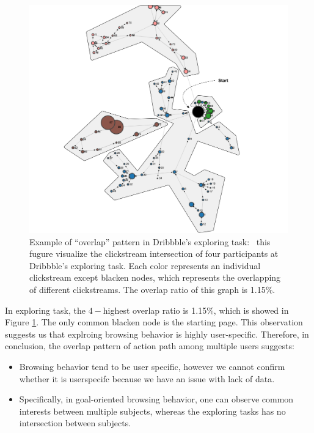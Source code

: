 \begin{figure}[H]
    \centering
    \includegraphics[width=1\textwidth]{figures/overlap2}
    \caption{Example of ``overlap'' pattern in Dribbble's exploring task: \
    this fugure visualize the clickstream intersection
    of four participants at Dribbble's exploring task. Each color represents an
    individual clickstream except blacken nodes, which represents the overlapping of different clickstreams.
    The overlap ratio of this graph is 1.15\%.}
    \label{fig:overlap-example-2}
\end{figure}

In exploring task, the $4-$highest overlap ratio is 1.15\%, which is showed in Figure \ref{fig:overlap-example-2}.
The only common blacken node is the starting page.
This observation suggests us that explroing browsing behavior is highly user-specific.
Therefore, in conclusion, the overlap pattern of action path among multiple users suggests:

\begin{itemize}
    \item Browsing behavior tend to be user specific, however we cannot confirm whether it is 
    user\-specifc because we have an issue with lack of data.
    \item Specifically, in goal-oriented browsing behavior, 
    one can observe common interests between multiple subjects,
    whereas the exploring tasks has no intersection between subjects.
\end{itemize}

